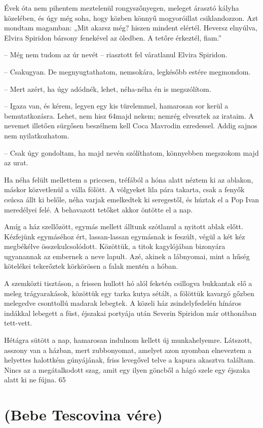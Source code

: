 \documentclass{IEEEtran}
\begin{document}
Évek óta nem pihentem meztelenül rongyszőnyegen, meleget árasztó kályha
közelében, és úgy még soha, hogy közben könnyű mogyoróillat csiklandozzon. Azt
mondtam magamban: „Mit akarsz még? hiszen mindent elértél. Heversz elnyúlva,
Elvira Spiridon bársony fenekével az öledben. A tetőre érkeztél, fiam.”

– Még nem tudom az úr nevét – riasztott fel váratlanul Elvira Spiridon.

– Csakugyan. De megnyugtathatom, nemsokára, legkésőbb estére megmondom.

– Mert azért, ha úgy adódnék, lehet, néha-néha én is megszólítom.

– Igaza van, és kérem, legyen egy kis türelemmel, hamarosan sor kerül a
bemutatkozásra. Lehet, nem hisz 64majd nekem; nemrég elvesztek az irataim. A
nevemet illetően sürgősen beszélnem kell Coca Mavrodin ezredessel. Addig
sajnos nem nyilatkozhatom.

– Csak úgy gondoltam, ha majd nevén szólíthatom, könnyebben megszokom majd az
urat.

Ha néha felült mellettem a priccsen, tréfából a hóna alatt néztem ki az
ablakon, máskor közvetlenül a válla fölött. A völgyeket lila pára takarta,
csak a fenyők csúcsa állt ki belőle, néha varjak emelkedtek ki seregestől, és
húztak el a Pop Ivan meredélyei felé. A behavazott tetőket akkor öntötte el a
nap.

Amíg a ház szellőzött, egymás mellett álltunk szótlanul a nyitott ablak előtt.
Kézfejünk egymáséhoz ért, lassan-lassan egymásnak is feszült, végül a két kéz
megbékélve összekulcsolódott. Közöttük, a titok kagylójában bizonyára
ugyanannak az embernek a neve lapult. Azé, akinek a lábnyomai, mint a hűség
kötelékei tekerőztek körkörösen a falak mentén a hóban.

A szemközti tisztáson, a frissen hullott hó alól feketén csillogva bukkantak
elő a meleg trágyarakások, közöttük egy tarka kutya sétált, a fölöttük kavargó
gőzben melegedve csonttollú madarak lebegtek. A közeli ház zsindelyfedelén
hínáros indákkal lebegett a füst, éjszakai portyája után Severin Spiridon már
otthonában tett-vett.

Hétágra sütött a nap, hamarosan indulnom kellett új munkahelyemre. Látszott,
asszony van a házban, mert zubbonyomat, amelyet azon nyomban elneveztem a
helyettes halottkém gúnyájának, friss levegővel telve a kapura akasztva
találtam. Nincs az a megátalkodott szag, amit egy ilyen göncből a hágó szele
egy éjszaka alatt ki ne fújna.
65
\section{(Bebe Tescovina vére)}
\end{document}

